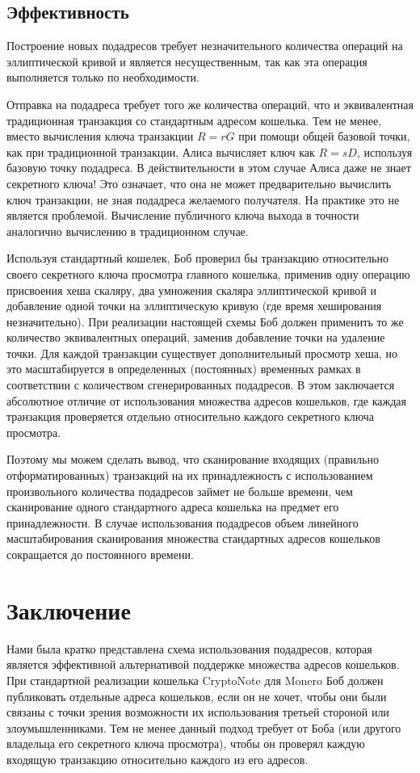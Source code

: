 \documentclass{mrl}
\begin{document}
\subsection{Эффективность}
Построение новых подадресов требует незначительного количества операций на эллиптической кривой и является несущественным, так как эта операция выполняется только по необходимости.

Отправка на подадреса требует того же количества операций, что и эквивалентная традиционная транзакция со стандартным адресом кошелька. Тем не менее, вместо вычисления ключа транзакции $R = rG$ при помощи общей базовой точки, как при традиционной транзакции, Алиса вычисляет ключ как $R = sD$, используя базовую точку подадреса. В действительности в этом случае Алиса даже не знает секретного ключа! Это означает, что она не может предварительно вычислить ключ транзакции, не зная подадреса желаемого получателя. На практике это не является проблемой. Вычисление публичного ключа выхода в точности аналогично вычислению в традиционном случае.

Используя стандартный кошелек, Боб проверил бы транзакцию относительно своего секретного ключа просмотра главного кошелька, применив одну операцию присвоения хеша скаляру, два умножения скаляра эллиптической кривой и добавление одной точки на эллиптическую кривую (где время хеширования незначительно). При реализации настоящей схемы Боб должен применить то же количество эквивалентных операций, заменив добавление точки на удаление точки. Для каждой транзакции существует дополнительный просмотр хеша, но это масштабируется в определенных (постоянных) временных рамках в соответствии с количеством сгенерированных подадресов. В этом заключается абсолютное отличие от использования множества адресов кошельков, где каждая транзакция проверяется отдельно относительно каждого секретного ключа просмотра.

Поэтому мы можем сделать вывод, что сканирование входящих (правильно отформатированных) транзакций на их принадлежность с использованием произвольного количества подадресов займет не больше времени, чем сканирование одного стандартного адреса кошелька на предмет его принадлежности. В случае использования подадресов объем линейного масштабирования сканирования множества стандартных адресов кошельков сокращается до постоянного времени.


\section{Заключение}
Нами была кратко представлена схема использования подадресов, которая является эффективной альтернативой поддержке множества адресов кошельков. При стандартной реализации кошелька \linebreak CryptoNote для Monero Боб должен публиковать отдельные адреса кошельков, если он не хочет, чтобы они были связаны с точки зрения возможности их использования третьей стороной или злоумышленниками. Тем не менее данный подход требует от Боба (или другого владельца его секретного ключа просмотра), чтобы он проверял каждую входящую транзакцию относительно каждого из его адресов.
\end{document}
